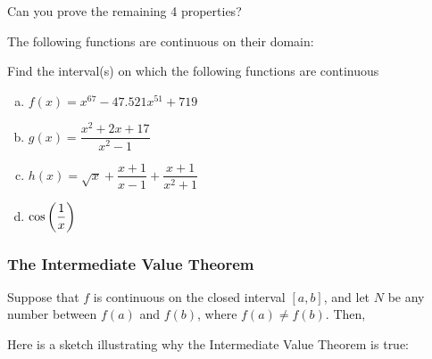 \documentclass[notes]{subfiles}
\begin{document}
		\begin{question}
			Can you prove the remaining 4 properties?
		\end{question}
			
		\begin{thm}
			The following functions are continuous on their domain:
		\end{thm}
			\newpage
			
		\begin{ex}
			Find the interval(s) on which the following functions are continuous
			\begin{enumerate}[(a)]
				\item $f(x) = x^{67}-47.521x^{51}+719$
					
				\item $g(x) = \dfrac{x^2+2x+17}{x^2-1}$
					
				\item $h(x) = \sqrt{x} + \dfrac{x+1}{x-1} + \dfrac{x+1}{x^2+1}$
					
				\item $\cos\left( \dfrac{1}{x}\right)$
					
			\end{enumerate}
		\end{ex}
			\newpage
			
	\subsubsection*{The Intermediate Value Theorem}
		\begin{thm}
			Suppose that $f$ is continuous on the closed interval $[a,b]$, and let $N$ be any number between $f(a)$ and $f(b)$, where $f(a)\neq f(b)$.  Then,
		\end{thm}
		Here is a sketch illustrating why the Intermediate Value Theorem is true:
\end{document}
